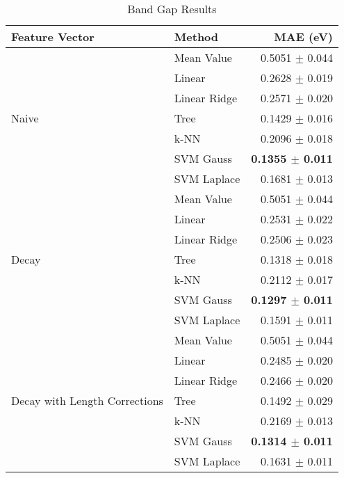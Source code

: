 \documentclass[10pt]{article}
\begin{document}
\begin{table}[H]
  \centering
  \caption{Band Gap Results}
  \begin{tabular}{llr}
            Feature Vector     & Method       & MAE (eV)                \\
    \hline\hline
    \multirow{7}{*}{Naive}     & Mean Value   & 0.5051 $\pm$ 0.044 \\
                               & Linear       & 0.2628 $\pm$ 0.019 \\
                               & Linear Ridge & 0.2571 $\pm$ 0.020 \\
                               & Tree         & 0.1429 $\pm$ 0.016 \\
                               & k-NN         & 0.2096 $\pm$ 0.018 \\
                               & SVM Gauss    & \textbf{0.1355 $\pm$ 0.011} \\
                               & SVM Laplace  & 0.1681 $\pm$ 0.013 \\
    \hline
    \multirow{7}{*}{Decay}     & Mean Value   & 0.5051 $\pm$ 0.044 \\
                               & Linear       & 0.2531 $\pm$ 0.022 \\
                               & Linear Ridge & 0.2506 $\pm$ 0.023 \\
                               & Tree         & 0.1318 $\pm$ 0.018 \\
                               & k-NN         & 0.2112 $\pm$ 0.017 \\
                               & SVM Gauss    & \textbf{0.1297 $\pm$ 0.011} \\
                               & SVM Laplace  & 0.1591 $\pm$ 0.011 \\
    \hline
    \multirow{7}{*}{Decay with Length Corrections} & Mean Value   & 0.5051 $\pm$ 0.044 \\
                               & Linear       & 0.2485 $\pm$ 0.020 \\
                               & Linear Ridge & 0.2466 $\pm$ 0.020 \\
                               & Tree         & 0.1492 $\pm$ 0.029 \\
                               & k-NN         & 0.2169 $\pm$ 0.013 \\
                               & SVM Gauss    & \textbf{0.1314 $\pm$ 0.011} \\
                               & SVM Laplace  & 0.1631 $\pm$ 0.011 \\

\end{tabular}
\end{table}
\end{document}
